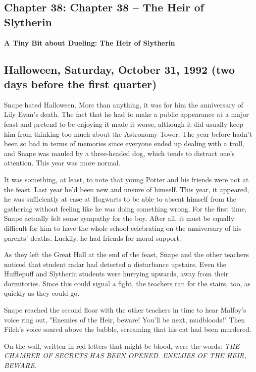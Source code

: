 \documentclass[a4paper,11pt]{article}
\begin{document}
\subsection{Chapter 38: Chapter 38 – The Heir of Slytherin}

\textbf{A Tiny Bit about Dueling: The Heir of Slytherin}

\subsection{Halloween, Saturday, October 31, 1992 (two days before the first quarter)}

Snape hated Halloween. More than anything, it was for him the anniversary of Lily Evan's death. The fact that he had to make a public appearance at a major feast and pretend to be enjoying it made it worse, although it did usually keep him from thinking too much about the Astronomy Tower. The year before hadn't been so bad in terms of memories since everyone ended up dealing with a troll, and Snape was mauled by a three-headed dog, which tends to distract one's attention. This year was more normal.

It was something, at least, to note that young Potter and his friends were not at the feast. Last year he'd been new and unsure of himself. This year, it appeared, he was sufficiently at ease at Hogwarts to be able to absent himself from the gathering without feeling like he was doing something wrong. For the first time, Snape actually felt some sympathy for the boy. After all, it must be equally difficult for him to have the whole school celebrating on the anniversary of his parents' deaths. Luckily, he had friends for moral support.

As they left the Great Hall at the end of the feast, Snape and the other teachers noticed that student radar had detected a disturbance upstairs. Even the Hufflepuff and Slytherin students were hurrying upwards, away from their dormitories. Since this could signal a fight, the teachers ran for the stairs, too, as quickly as they could go.

Snape reached the second floor with the other teachers in time to hear Malfoy's voice ring out, "Enemies of the Heir, beware! You'll be next, mudbloods!" Then Filch's voice soared above the babble, screaming that his cat had been murdered.

On the wall, written in red letters that might be blood, were the words: \emph{THE CHAMBER OF SECRETS HAS BEEN OPENED. ENEMIES OF THE HEIR, BEWARE}.
\end{document}
